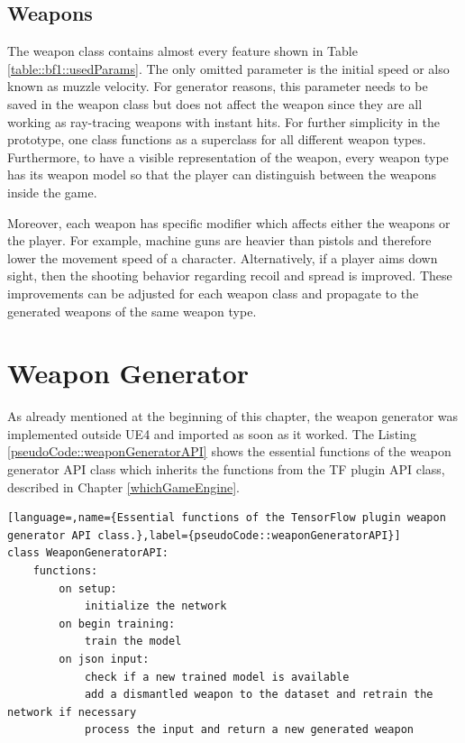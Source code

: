 \documentclass[MGS,Master,english]{twbook}%
\begin{document}
\subsection{Weapons}
The weapon class contains almost every feature shown in Table \ref{table::bf1::usedParams}. The only omitted parameter is the initial speed or also known as muzzle velocity. For generator reasons, this parameter needs to be saved in the weapon class but does not affect the weapon since they are all working as ray-tracing weapons with instant hits. For further simplicity in the prototype, one class functions as a superclass for all different weapon types. Furthermore, to have a visible representation of the weapon, every weapon type has its weapon model so that the player can distinguish between the weapons inside the game. 

Moreover, each weapon has specific modifier which affects either the weapons or the player. For example, machine guns are heavier than pistols and therefore lower the movement speed of a character. Alternatively, if a player aims down sight, then the shooting behavior regarding recoil and spread is improved. These improvements can be adjusted for each weapon class and propagate to the generated weapons of the same weapon type.

\section{Weapon Generator}
As already mentioned at the beginning of this chapter, the weapon generator was implemented outside UE4 and imported as soon as it worked. The Listing \ref{pseudoCode::weaponGeneratorAPI} shows the essential functions of the weapon generator API class which inherits the functions from the TF plugin API class, described in Chapter \ref{whichGameEngine}. 
\begin{lstlisting}[language=,name={Essential functions of the TensorFlow plugin weapon generator API class.},label={pseudoCode::weaponGeneratorAPI}]
class WeaponGeneratorAPI:
	functions:
		on setup:
			initialize the network
		on begin training:
			train the model
		on json input:
			check if a new trained model is available
			add a dismantled weapon to the dataset and retrain the network if necessary
			process the input and return a new generated weapon
\end{lstlisting}
\end{document}
